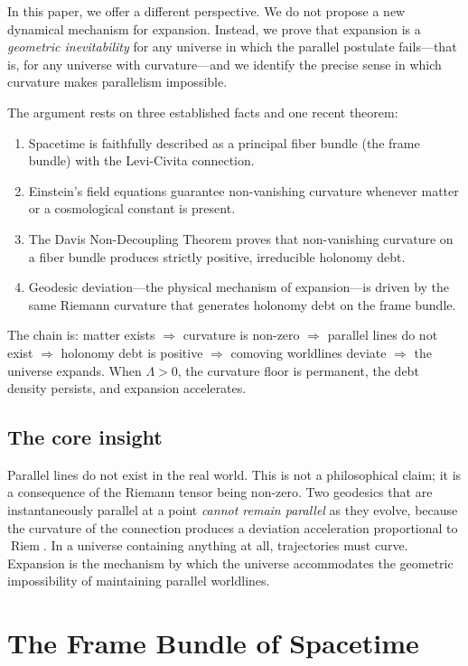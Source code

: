 \documentclass[12pt]{amsart}
\theoremstyle{definition}
\newcommand{\Riem}{\operatorname{Riem}}
\begin{document}
In this paper, we offer a different perspective.  We do not propose a new dynamical mechanism for expansion.  Instead, we prove that expansion is a \emph{geometric inevitability} for any universe in which the parallel postulate fails---that is, for any universe with curvature---and we identify the precise sense in which curvature makes parallelism impossible.

The argument rests on three established facts and one recent theorem:
\begin{enumerate}[label=(\roman*)]
\item Spacetime is faithfully described as a principal fiber bundle (the frame bundle) with the Levi-Civita connection.
\item Einstein's field equations guarantee non-vanishing curvature whenever matter or a cosmological constant is present.
\item The Davis Non-Decoupling Theorem \cite{davis2026} proves that non-vanishing curvature on a fiber bundle produces strictly positive, irreducible holonomy debt.
\item Geodesic deviation---the physical mechanism of expansion---is driven by the same Riemann curvature that generates holonomy debt on the frame bundle.
\end{enumerate}

The chain is: matter exists $\Longrightarrow$ curvature is non-zero $\Longrightarrow$ parallel lines do not exist $\Longrightarrow$ holonomy debt is positive $\Longrightarrow$ comoving worldlines deviate $\Longrightarrow$ the universe expands.  When $\Lambda > 0$, the curvature floor is permanent, the debt density persists, and expansion accelerates.

\subsection{The core insight}  Parallel lines do not exist in the real world.  This is not a philosophical claim; it is a consequence of the Riemann tensor being non-zero.  Two geodesics that are instantaneously parallel at a point \emph{cannot remain parallel} as they evolve, because the curvature of the connection produces a deviation acceleration proportional to $\Riem$.  In a universe containing anything at all, trajectories must curve.  Expansion is the mechanism by which the universe accommodates the geometric impossibility of maintaining parallel worldlines.


\section{The Frame Bundle of Spacetime}
\end{document}
